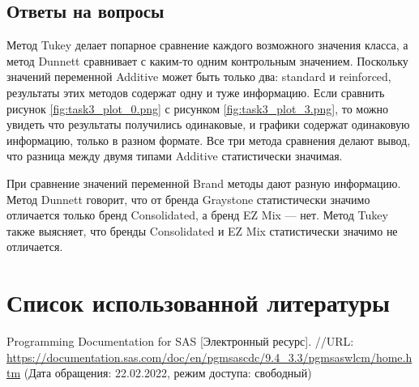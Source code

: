 \documentclass[12pt,a4paper]{article}
\begin{document}
  \subsection{Ответы на вопросы}
  Метод Tukey делает попарное сравнение каждого возможного значения класса,
  а метод Dunnett сравнивает с каким-то одним контрольным значением.
  Поскольку значений переменной Additive может быть только два: standard и reinforced,
  результаты этих методов содержат одну и туже информацию.
  Если сравнить рисунок \ref{fig:task3_plot_0.png} с рисунком \ref{fig:task3_plot_3.png},
  то можно увидеть что результаты получились одинаковые,
  и графики содержат одинаковую информацию, только в разном формате.
  Все три метода сравнения делают вывод, что разница между двумя типами Additive статистически значимая.

  При сравнение значений переменной Brand методы дают разную информацию.
  Метод Dunnett говорит, что от бренда Graystone статистически значимо отличается только бренд Consolidated,
  а бренд EZ Mix --- нет.
  Метод Tukey также выясняет, что бренды Consolidated и EZ Mix статистически значимо не отличается.

  \newpage
  \section{Список использованной литературы}
  \begin{thebibliography}{3}
     Programming Documentation for SAS [Электронный ресурс].
      //URL: \url{https://documentation.sas.com/doc/en/pgmsascdc/9.4_3.3/pgmsaswlcm/home.htm}
      (Дата обращения: 22.02.2022, режим доступа: свободный)
  \end{thebibliography}
\end{document}
